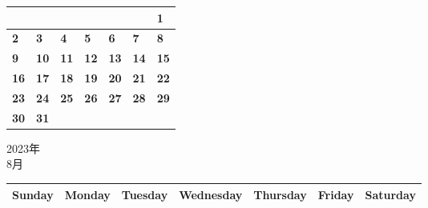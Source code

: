 \documentclass[a4paper,landscape]{jsarticle}
\newcommand{\dig}{\hspace{29mm}}
\newcommand{\tdig}{\hspace{27mm}}
\newcommand{\LBF}{\LARGE\textbf}
\begin{document}
\begingroup
\renewcommand{\arraystretch}{4}
\begin{tabular}{|p{32mm}|p{32mm}|p{32mm}|p{32mm}|p{32mm}|p{32mm}|p{32mm}|}
\hline
&&&&&&\raisebox{30pt} {\dig\LBF{1}}\\
\hline
\raisebox{30pt} {\dig\LBF{2}}&\raisebox{30pt} {\dig\LBF{3}}&\raisebox{30pt} {\dig\LBF{4}}&\raisebox{30pt} {\dig\LBF{5}}&\raisebox{30pt} {\dig\LBF{6}}&\raisebox{30pt} {\dig\LBF{7}}&\raisebox{30pt} {\dig\LBF{8}}\\
\hline
\raisebox{30pt} {\dig\LBF{9}}&\raisebox{30pt} {\tdig\LBF{10}}&\raisebox{30pt} {\tdig\LBF{11}}&\raisebox{30pt} {\tdig\LBF{12}}&\raisebox{30pt} {\tdig\LBF{13}}&\raisebox{30pt} {\tdig\LBF{14}}&\raisebox{30pt} {\tdig\LBF{15}}\\
\hline
\raisebox{30pt} {\tdig\LBF{16}}&\raisebox{30pt} {\tdig\LBF{17}}&\raisebox{30pt} {\tdig\LBF{18}}&\raisebox{30pt} {\tdig\LBF{19}}&\raisebox{30pt} {\tdig\LBF{20}}&\raisebox{30pt} {\tdig\LBF{21}}&\raisebox{30pt} {\tdig\LBF{22}}\\
\hline
\raisebox{30pt} {\tdig\LBF{23}}&\raisebox{30pt} {\tdig\LBF{24}}&\raisebox{30pt} {\tdig\LBF{25}}&\raisebox{30pt} {\tdig\LBF{26}}&\raisebox{30pt} {\tdig\LBF{27}}&\raisebox{30pt} {\tdig\LBF{28}}&\raisebox{30pt} {\tdig\LBF{29}}\\
\hline
\raisebox{30pt} {\tdig\LBF{30}}&\raisebox{30pt} {\tdig\LBF{31}}&&&&&\\
\hline
\end{tabular}
\endgroup
\newpage\begin{center}
	\LARGE 2023年\\
	\LARGE 8月
\end{center}

\begingroup
\renewcommand{\arraystretch}{1.4}
\begin{tabular}{|>{\centering\arraybackslash}p{32mm}|>{\centering\arraybackslash}p{32mm}|>{\centering\arraybackslash}p{32mm}|>{\centering\arraybackslash}p{32mm}|>{\centering\arraybackslash}p{32mm}|>{\centering\arraybackslash}p{32mm}|>{\centering\arraybackslash}p{32mm}|}
\hline
\large Sunday&\large Monday &\large Tuesday&\large Wednesday&\large Thursday&\large Friday&\large Saturday\\
\hline
\end{tabular}
\endgroup
\end{document}
